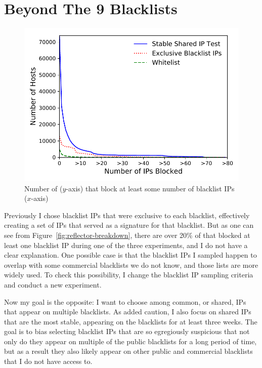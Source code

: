 \section{Beyond The 9 Blacklists}
\label{sec:large-scale}

\begin{figure}[t]
\centering
\includegraphics[width=0.8\columnwidth]{data_usage/images/large_scale_rcdf_v2.pdf}
\caption{Number of {} ($y$-axis) that block at least
  some number of blacklist IPs ($x$-axis)}
\label{fig:large_scale_rcdf}
\end{figure}


Previously I chose blacklist IPs that were exclusive to each
blacklist, effectively creating a set of IPs that served as a
signature for that blacklist. But as one can see from Figure~\ref{fig:reflector-breakdown},
there are over 20\% of {} that blocked at least one
blacklist IP during one of the three experiments, and I do not
have a clear explanation. One possible case is that the blacklist IPs
I sampled happen to overlap with some commercial blacklists we
do not know, and those lists are more widely used. To check this
possibility, I change the blacklist IP sampling criteria and conduct
a new experiment.

Now my goal is the opposite: I want
to choose among common, or shared, IPs that appear on multiple
blacklists.  As added caution, I also focus on shared IPs that are
the most stable, appearing on the blacklists for at least three weeks.
The goal is to bias selecting blacklist IPs that are so egregiously
suspicious that not only do they appear on multiple of the public
blacklists for a long period of time, but as a result they also likely
appear on other public and commercial blacklists that I do not have
access to.

